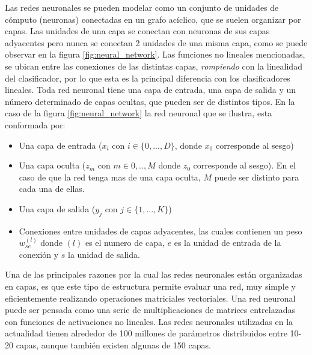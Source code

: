 \documentclass[a4paper,11pt,spanish]{book}
\begin{document}
	Las redes neuronales se pueden modelar como un conjunto de unidades de cómputo (neuronas) conectadas en un grafo acíclico, que se suelen organizar por capas.
	Las unidades de una capa se conectan con neuronas de sus capas adyacentes pero nunca se conectan 2 unidades de una misma capa, como se puede observar en la figura 
	\ref{fig:neural_network}.
	Las funciones no lineales mencionadas, se ubican entre las conexiones de las distintas capas, \emph{rompiendo} con la linealidad del clasificador, por lo que esta es la principal
	diferencia con los clasificadores lineales.
	Toda red neuronal tiene una capa de entrada, una capa de salida y un número determinado de capas ocultas, que pueden ser de distintos tipos. 
	En la caso de la figura \ref{fig:neural_network} la red neuronal que se ilustra, esta conformada por:
	\begin{itemize}
	 \item Una capa de entrada ($x_i$ con $i \in \{0,...,D\}$, donde $x_0$ corresponde al sesgo)
	 \item Una capa oculta ($z_m$ con $m \in {0,..,M}$ donde $z_0$ corresponde al sesgo). En el caso de que la red tenga mas de una capa oculta, $M$ puede ser distinto 
	 para cada una de ellas.
	 \item Una capa de salida ($y_j$ con $j \in \{1,...,K\}$)
	 \item Conexiones entre unidades de capas adyacentes, las cuales contienen un peso $w^{(l)}_{se}$ donde $(l)$ es el numero de capa, $e$ es la unidad de entrada 
	 de la conexión y $s$ la unidad de salida.
	\end{itemize}

	Una de las principales razones por la cual las redes neuronales están organizadas en capas, es que este tipo de estructura permite evaluar una red, muy simple y eficientemente 
	realizando operaciones matriciales vectoriales. Una red neuronal puede ser pensada como una serie de multiplicaciones de matrices entrelazadas con funciones de 
	activaciones no lineales.
	Las redes neuronales utilizadas en la actualidad tienen alrededor de 100 millones de parámetros distribuidos entre 10-20 capas, aunque también existen algunas de 150 capas.
\end{document}
